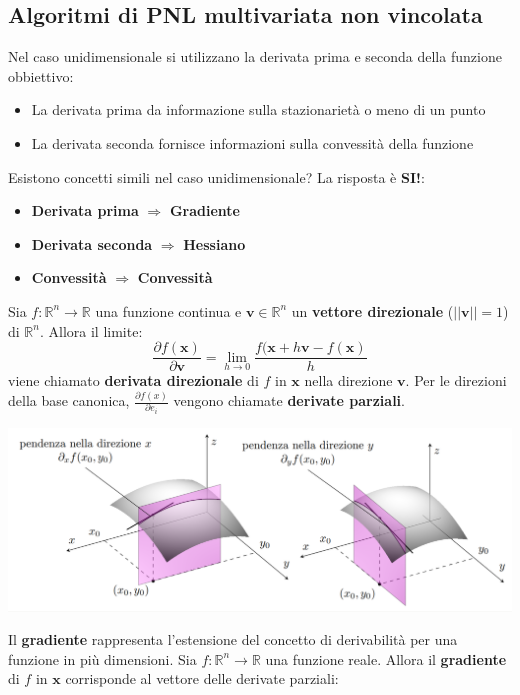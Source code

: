 \documentclass[12pt]{article}
\begin{document}
\subsection{Algoritmi di PNL multivariata non vincolata}
Nel caso unidimensionale si utilizzano la derivata prima e seconda della funzione obbiettivo:
\begin{itemize}
    \item La derivata prima da informazione sulla stazionarietà o meno di un punto
    \item La derivata seconda fornisce informazioni sulla convessità della funzione
\end{itemize}
Esistono concetti simili nel caso unidimensionale? La risposta è \textbf{SI!}:
\begin{itemize}
    \item \textbf{Derivata prima} $\Rightarrow$ \textbf{Gradiente}
    \item \textbf{Derivata seconda} $\Rightarrow$ \textbf{Hessiano}
    \item \textbf{Convessità} $\Rightarrow$ \textbf{Convessità}
\end{itemize}
Sia $f:\mathbb{R}^n \rightarrow \mathbb{R}$ una funzione continua e $\boldsymbol{v} \in \mathbb{R}^n$ un \textbf{vettore direzionale} ($\left | |\boldsymbol{v}|\right | = 1$) di $\mathbb{R}^n$. Allora il limite:
$$\frac{\partial f(\boldsymbol{x})}{\partial \boldsymbol{v}} = \lim_{h \rightarrow 0}{\frac{f(\boldsymbol{x} + h\boldsymbol{v} - f(\boldsymbol{x})}{h}}$$
viene chiamato \textbf{derivata direzionale} di $f$ in $\boldsymbol{x}$ nella direzione $\boldsymbol{v}$.
Per le direzioni della base canonica, $\frac{\partial f(x)}{\partial e_i}$ vengono chiamate \textbf{derivate parziali}.
\begin{center}
    \includegraphics[width = 1\linewidth]{Images/100.PNG}
\end{center}
Il \textbf{gradiente} rappresenta l'estensione del concetto di derivabilità per una funzione in più dimensioni.
Sia $f:\mathbb{R}^n \rightarrow \mathbb{R}$ una funzione reale. Allora il \textbf{gradiente} di $f$ in $\boldsymbol{x}$ corrisponde al vettore delle derivate parziali:
\end{document}
